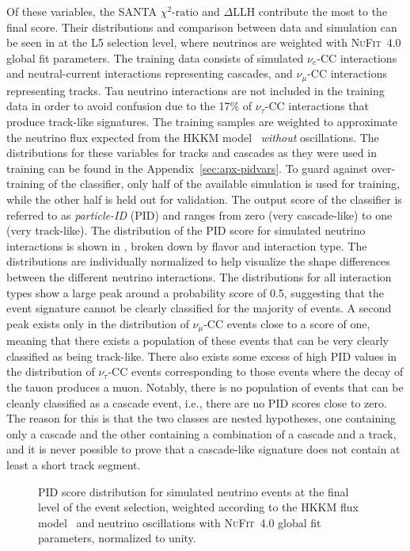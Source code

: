 Of these variables, the SANTA $\chi^2\textrm{-ratio}$ and $\Delta$LLH contribute the most to the final score. Their distributions and comparison between data and simulation can be seen in  at the L5 selection level, where neutrinos are weighted with \textsc{NuFit}~4.0\cite{nufit40} global fit parameters.
The training data consists of simulated $\nu_e$-CC interactions and neutral-current interactions representing cascades, and $\nu_\mu$-CC interactions representing tracks. Tau neutrino interactions are not included in the training data in order to avoid confusion due to the 17\% of $\nu_\tau$-CC interactions that produce track-like signatures. The training samples are weighted to approximate the neutrino flux expected from the HKKM model~ \emph{without} oscillations. The distributions for these variables for tracks and cascades as they were used in training can be found in the Appendix~\ref{sec:apx-pidvars}. To guard against over-training of the classifier, only half of the available simulation is used for training, while the other half is held out for validation. The output score of the classifier is referred to as \emph{particle-ID} (PID) and ranges from zero (very cascade-like) to one (very track-like). The distribution of the PID score for simulated neutrino interactions is shown in , broken down by flavor and interaction type. The distributions are individually normalized to help visualize the shape differences between the different neutrino interactions. The distributions for all interaction types show a large peak around a probability score of 0.5, suggesting that the event signature cannot be clearly classified for the majority of events. A second peak exists only in the distribution of $\nu_\mu$-CC events close to a score of one, meaning that there exists a population of these events that can be very clearly classified as being track-like. There also exists some excess of high PID values in the distribution of $\nu_\tau$-CC events corresponding to those events where the decay of the tauon produces a muon. Notably, there is no population of events that can be cleanly classified as a cascade event, i.e., there are no PID scores close to zero. The reason for this is that the two classes are nested hypotheses, one containing only a cascade and the other containing a combination of a cascade and a track, and it is never possible to prove that a cascade-like signature does not contain at least a short track segment.
\begin{figure}
    \centering
    
    \caption{PID score distribution for simulated neutrino events at the final level of the event selection, weighted according to the HKKM flux model~\cite{Honda:2015fha} and neutrino oscillations with \textsc{NuFit}~4.0\cite{nufit40} global fit parameters, normalized to unity.}
    \label{fig:pid-score}
\end{figure}

